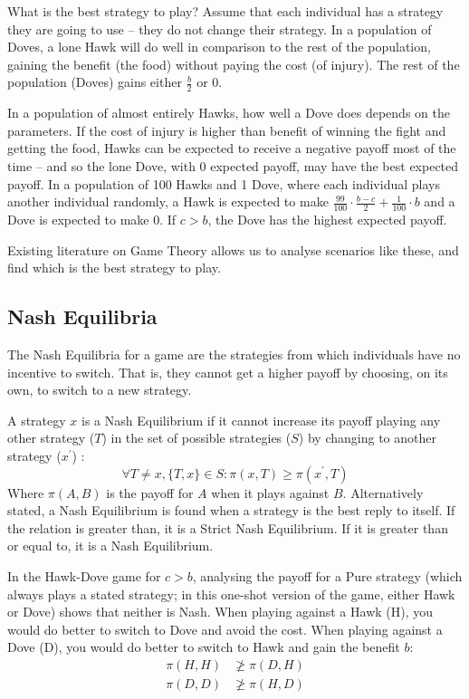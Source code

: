 \documentclass[a4paper,11pt,bcshonoursthesis,singlespace,oneside,thesisdraft,pdflatex]{cssethesis}
\begin{document}
What is the best strategy to play? 
Assume that each individual has a strategy they are going to use -- they do not change their strategy. 
In a population of Doves, a lone Hawk will do well in comparison to the rest of the population, gaining the benefit (the food) without paying the cost (of injury). 
The rest of the population (Doves) gains either $\frac{b}{2}$ or $0$. 

In a population of almost entirely Hawks, how well a Dove does depends on the parameters. 
If the cost of injury is higher than benefit of winning the fight and getting the food, Hawks can be expected to receive a negative payoff most of the time -- and so the lone Dove, with $0$ expected payoff, may have the best expected payoff. In a population of 100 Hawks and 1 Dove, where each individual plays another individual randomly, a Hawk is expected to make $\frac{99}{100}\cdot\frac{b-c}{2}+\frac{1}{100}\cdot b$ and a Dove is expected to make $0$. If $c>b$, the Dove has the highest expected payoff. 

Existing literature on Game Theory allows us to analyse scenarios like these, and find which is the best strategy to play.
\subsection{Nash Equilibria}
The Nash Equilibria for a game are the strategies from which individuals have no incentive to switch. 
That is, they cannot get a higher payoff by choosing, on its own, to switch to a new strategy.  

A strategy $x$ is a Nash Equilibrium if it cannot increase its payoff playing any other strategy ($T$) in the set of possible strategies ($S$) by changing to another strategy ($x^\prime$) \citep[][ch. 1]{robert1992primer}:
\begin{equation}
\forall T \neq x, \{T,x\} \in S: \pi(x,T)\geq \pi(x^\prime,T)
\end{equation}
Where $\pi(A,B)$ is the payoff for $A$ when it plays against $B$. 
Alternatively stated, a Nash Equilibrium is found when a strategy is the best reply to itself. 
If the relation is greater than, it is a Strict Nash Equilibrium. 
If it is greater than or equal to, it is a Nash Equilibrium.

In the Hawk-Dove game for $c>b$, analysing the payoff for a Pure strategy (which always plays a stated strategy; in this one-shot version of the game, either Hawk or Dove) shows that neither is Nash. 
When playing against a Hawk (H), you would do better to switch to Dove and avoid the cost. 
When playing against a Dove (D), you would do better to switch to Hawk and gain the benefit $b$:
\begin{align*}
\pi(H,H)&\ngeq \pi(D,H)\\
\pi(D,D)&\ngeq \pi(H,D)
\end{align*}
\end{document}
